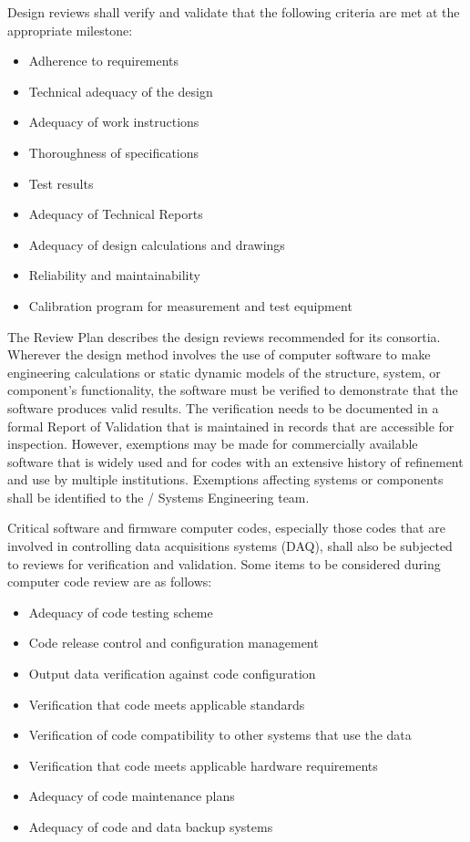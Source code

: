 Design reviews shall verify and validate that the following criteria
are met at the appropriate milestone:
\begin{itemize}
 \item Adherence to requirements
 \item Technical adequacy of the design
 \item Adequacy of work instructions
 \item Thoroughness of specifications
 \item Test results
 \item Adequacy of Technical Reports
 \item Adequacy of design calculations and drawings
 \item Reliability and maintainability
 \item Calibration program for measurement and test equipment
\end{itemize}

The  Review Plan describes the design reviews recommended
for its consortia.  Wherever the design method involves the use of
computer software to make engineering calculations or static dynamic
models of the structure, system, or component's functionality, the
software must be verified to demonstrate that the software produces
valid results. The verification needs to be documented in a formal
Report of Validation that is maintained in records that are accessible
for inspection. However, exemptions may be made for commercially
available software that is widely used and for codes with an extensive
history of refinement and use by multiple institutions. Exemptions
affecting systems or components shall be identified to the
/ Systems Engineering team.

Critical software and firmware computer codes, especially those codes
that are involved in controlling  data acquisitions systems (DAQ),
shall also be subjected to reviews for verification and
validation. Some items to be considered during computer code review
are as follows:
\begin{itemize}
 \item Adequacy of code testing scheme
 \item Code release control and configuration management
 \item Output data verification against code configuration
 \item Verification that code meets applicable standards
 \item Verification of code compatibility to other systems that use the data
 \item Verification that code meets applicable hardware requirements
 \item Adequacy of code maintenance plans
 \item Adequacy of code and data backup systems
\end{itemize}

